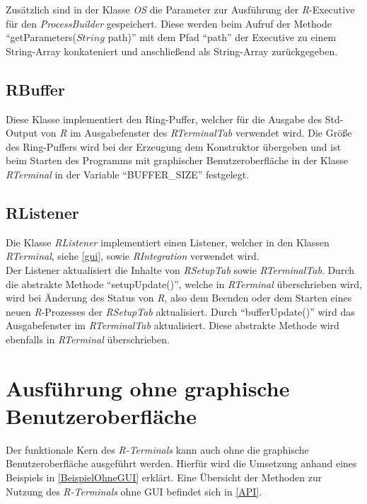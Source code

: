 \documentclass[a4paper, 12pt]{report} %
\begin{document}
Zusätzlich sind in der Klasse \textit{OS} die Parameter zur Ausführung der \textit{R}-Executive für den \textit{ProcessBuilder} gespeichert. Diese werden beim Aufruf der Methode "`getParameters($String$ path)"' mit dem Pfad "`path"' der Executive zu einem String-Array konkateniert und anschließend als String-Array zurückgegeben.

\subsection{RBuffer} \label{RBuffer}

Diese Klasse implementiert den Ring-Puffer, welcher für die Ausgabe des Std-Output von \textit{R} im Ausgabefenster des \textit{RTerminalTab} verwendet wird.
Die Größe des Ring-Puffers wird bei der Erzeugung dem Konstruktor übergeben und ist beim Starten des Programms mit graphischer Benutzeroberfläche in der Klasse \textit{RTerminal} in der Variable "`BUFFER\_SIZE"' festgelegt.

\subsection{RListener} \label{RListener}

Die Klasse \textit{RListener} implementiert einen Listener, welcher in den Klassen \textit{RTerminal}, siehe \ref{gui}, sowie \textit{RIntegration} verwendet wird. \\

Der Listener aktualisiert die Inhalte von \textit{RSetupTab} sowie \textit{RTerminalTab}. 
Durch die abstrakte Methode "`setupUpdate()"', welche in \textit{RTerminal} überschrieben wird, wird bei Änderung des Status von \textit{R}, also dem Beenden oder dem Starten eines neuen \textit{R}-Prozesses der \textit{RSetupTab} aktualisiert.
Durch "`bufferUpdate()"' wird das Ausgabefenster im \textit{RTerminalTab} aktualisiert. Diese abstrakte Methode wird ebenfalls in \textit{RTerminal} überschrieben.



\section{Ausführung ohne graphische Benutzeroberfläche} \label{ohne GUI}

Der funktionale Kern des \textit{R-Terminals} kann auch ohne die graphische Benutzeroberfläche ausgeführt werden. 
Hierfür wird die Umsetzung anhand eines Beispiels in \ref{BeispielOhneGUI} erklärt. 
Eine Übersicht der Methoden zur Nutzung des \textit{R-Terminals} ohne GUI befindet sich in \ref{API}.
\end{document}
